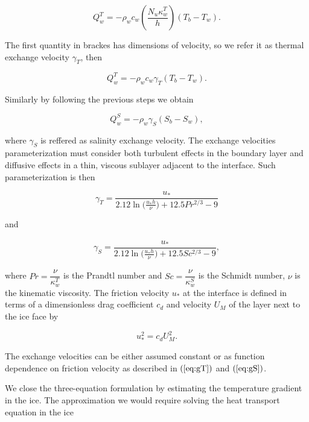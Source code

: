 \documentclass[11pt,a4paper]{article}
\begin{document}
		\begin{equation}
			Q_w^T = -\rho_wc_w\left(\dfrac{N_u\kappa_w^T}{h}\right)\left(T_b-T_w\right).
		\end{equation}
		
		The first quantity in brackes has dimensions of velocity, so we refer it as thermal exchange velocity $\gamma_T$, then 
		
		\begin{equation}
			Q_w^T = -\rho_wc_w\gamma_T(T_b-T_w).
		\end{equation}
	
		Similarly by following the previous steps we obtain
		
		\begin{equation}
			Q_w^S = -\rho_w\gamma_S(S_b-S_w),
		\end{equation}
		
		where $\gamma_S$ is reffered as salinity exchange velocity. The exchange velocities parameterization must consider both turbulent effects in the boundary layer and diffusive effects in a thin, viscous sublayer adjacent to the interface. Such parameterization is then
		
		\begin{equation}
			\label{eq:gT}
			\gamma_{T} = \dfrac{u_*}{2.12\ln\bigg(\frac{u_*h}{\nu}\bigg)+12.5 Pr^{2/3}-9}
		\end{equation}
		
		
		and
		
		\begin{align}
			\label{eq:gS}
			\gamma_{S} = \dfrac{u_*}{2.12\ln\bigg(\frac{u_*h}{\nu}\bigg)+12.5 Sc^{2/3}-9},
		\end{align}
		 
		
		where $Pr = \dfrac{\nu}{\kappa_w^T}$ is the Prandtl number and $Sc =  \dfrac{\nu}{\kappa_w^S}$ is the Schmidt number, $\nu$ is the kinematic viscosity. The friction velocity $u_*$ at the interface is defined in terms of a dimensionless drag coefficient $c_d$ and velocity $U_M$ of the layer next to the ice face by
		
		$$u_*^2 = c_d U_M^2.$$
		
		The exchange velocities can be either assumed constant or as function dependence on friction velocity as described in $(\ref{eq:gT})$ and $(\ref{eq:gS})$.
		
		
		We close the three-equation formulation by estimating the temperature gradient in the ice. The approximation we would require solving the heat transport equation in the ice
		
\end{document}
